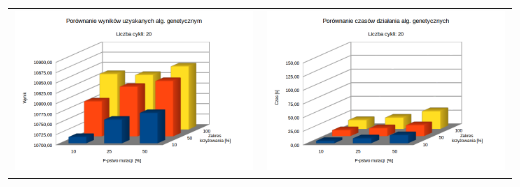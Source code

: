 \documentclass[pdflatex,11pt]{../aghdoc_version2}
\begin{document}
\begin{tabular}{cc}
	
\includegraphics[width=0.4\paperwidth]{pics/porownanie1/wynik20.png} & 
\includegraphics[width=0.4\paperwidth]{pics/porownanie1/czas20.png} \\
	

\end{tabular}
\end{document}
